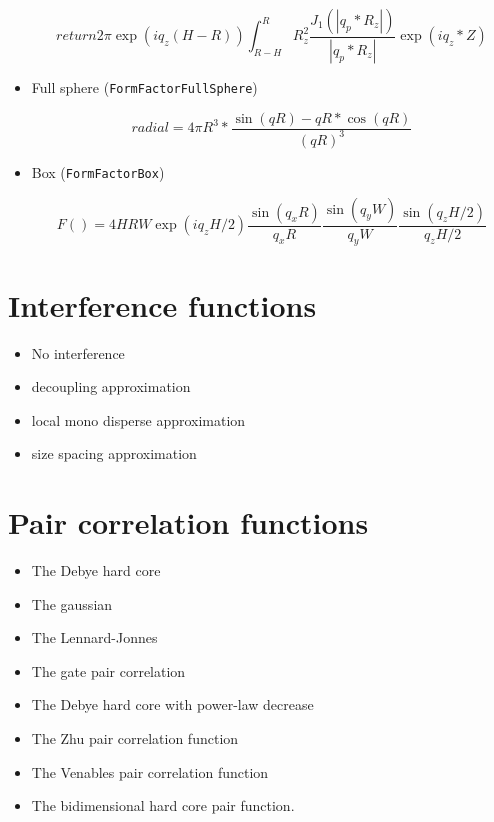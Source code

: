 \begin{itemize}
\begin{equation}    
return 2\pi \exp(i q_z (H-R))\int_{R-H} ^{R} R_z^2 \frac{J_1(|q_p*R_z|) }{|q_p*R_z|}
        \exp(i q_z*Z)
\end{equation}


\item Full sphere (\texttt{FormFactorFullSphere})

\begin{equation}
radial = 4\pi R^3*\frac{\sin(q R) - q R*\cos(q R)}{(qR)^3}
\end{equation}

\item Box (\texttt{FormFactorBox})

\begin{equation}
F()= 4H R W\exp(i q_z H/2) \frac{\sin(q_x R)}{q_x R} \frac{  \sin(q_y W) }{q_y W}\frac{\sin(q_z H/2)}{q_z H/2}
\end{equation}
    
	
\end{itemize}

\chapter{Interference functions}

\begin{itemize}
\item	No interference 
\item	decoupling approximation 	
\item 	local mono disperse approximation 
\item 	size spacing approximation 
\end{itemize}


\chapter{Pair correlation functions}
\begin{itemize}
\item The Debye hard core 
\item The gaussian
\item The Lennard-Jonnes  	
\item The gate pair correlation 	
\item The Debye hard core with power-law decrease  	
\item The Zhu pair correlation function 	
\item The Venables pair correlation function 	
\item The bidimensional hard core pair function.
\end{itemize}	